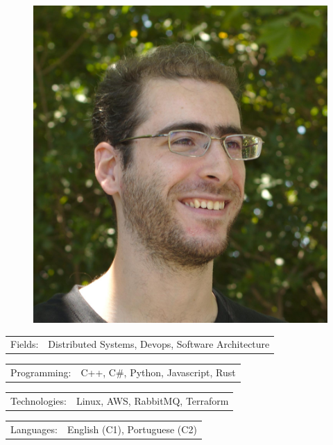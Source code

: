 \documentclass[10pt,A4]{article}
\newcommand{\tzlarrow}{(0,0) -- (0.2,0) -- (0.3,0.2) -- (0.2,0.4) -- (0,0.4) -- (0.1,0.2) -- cycle;}
\newcommand{\larrow}[1]
{\begin{tikzpicture}[scale=0.58]
	 \filldraw[fill=#1!100,draw=#1!100!black]  \tzlarrow
 \end{tikzpicture}
}
\newcommand{\metasection}[2]
{
\begin{tabular*}{1\textwidth}{p{2.6cm} p{11cm}}
\larrow{bgcol}	\normalsize{\textcolor{sectcol}{#1}}&#2\\[6pt]
\end{tabular*}
}
\begin{document}
\pagestyle{fancy}	


\vspace{-20.55pt}

\hspace{-0.25\linewidth}\colorbox{bgcol}{}



\begin{figure}[H]
\begin{flushright}
	\includegraphics[clip,width=0.2\linewidth]{myfoto.jpg}	%
\end{flushright}
\end{figure}



\vspace{-114pt}

\metasection{Fields:}{Distributed Systems, Devops, Software Architecture} 
\metasection{Programming:}{C++, C\#, Python, Javascript, Rust}
\metasection{Technologies:}{Linux, AWS, RabbitMQ, Terraform}
\metasection{Languages:}{English (C1), Portuguese (C2)}
\end{document}
